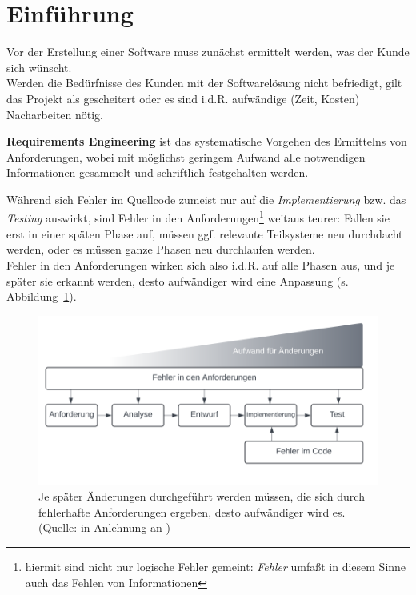 \section{Einführung}

\noindent
Vor der Erstellung einer Software muss zunächst ermittelt werden, was der Kunde sich wünscht.\\
Werden die Bedürfnisse des Kunden mit der Softwarelösung nicht befriedigt, gilt das Projekt als gescheitert oder es sind i.d.R. aufwändige (Zeit, Kosten) Nacharbeiten nötig.\\

\vspace{5mm}
\begin{tcolorbox}
    \textbf{Requirements Engineering} ist das systematische Vorgehen des Ermittelns von Anforderungen,
    wobei mit möglichst geringem Aufwand alle notwendigen Informationen gesammelt und schriftlich festgehalten werden.
\end{tcolorbox}
\vspace{5mm}

\noindent
Während sich Fehler im Quellcode zumeist nur auf die \textit{Implementierung} bzw. das \textit{Testing} auswirkt, sind Fehler in den Anforderungen\footnote{
hiermit sind nicht nur logische Fehler gemeint: \textit{Fehler} umfaßt in diesem Sinne auch das Fehlen von Informationen
} weitaus teurer: Fallen sie erst in einer späten Phase auf, müssen ggf. relevante Teilsysteme neu durchdacht werden, oder es müssen ganze Phasen neu durchlaufen werden.\\
Fehler in den Anforderungen wirken sich also i.d.R. auf alle Phasen aus, und je später sie erkannt werden, desto aufwändiger wird eine Anpassung (s. Abbildung~\ref{fig:aufwand}).

\begin{figure}
    \centering
    \includegraphics[scale=0.4]{chapters/Requirements Engineering/img/aufwand}
    \caption{Je später Änderungen durchgeführt werden müssen, die sich durch fehlerhafte Anforderungen ergeben, desto aufwändiger wird es. (Quelle: in Anlehnung an \cite[38 f., Abb. 4.1 und 4.2]{Wed09})}
    \label{fig:aufwand}
\end{figure}


